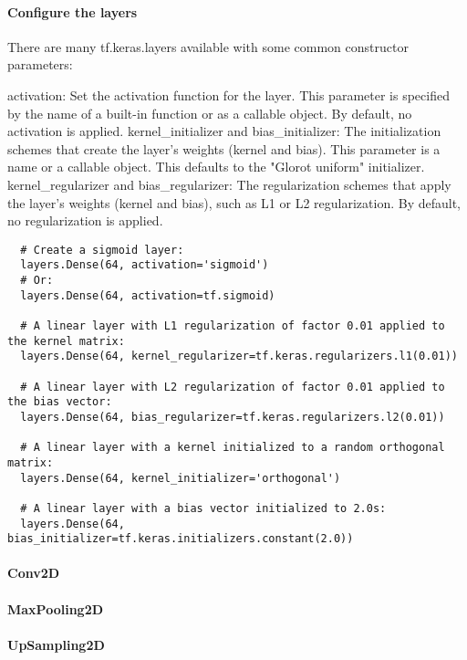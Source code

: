 \paragraph{Configure the layers}

There are many tf.keras.layers available with some common constructor parameters:

activation: Set the activation function for the layer. This parameter is specified by the name of a built-in function or as a callable object. By default, no activation is applied.
kernel_initializer and bias_initializer: The initialization schemes that create the layer's weights (kernel and bias). This parameter is a name or a callable object. This defaults to the "Glorot uniform" initializer.
kernel_regularizer and bias_regularizer: The regularization schemes that apply the layer's weights (kernel and bias), such as L1 or L2 regularization. By default, no regularization is applied.


\begin{verbatim}
  # Create a sigmoid layer:
  layers.Dense(64, activation='sigmoid')
  # Or:
  layers.Dense(64, activation=tf.sigmoid)

  # A linear layer with L1 regularization of factor 0.01 applied to the kernel matrix:
  layers.Dense(64, kernel_regularizer=tf.keras.regularizers.l1(0.01))

  # A linear layer with L2 regularization of factor 0.01 applied to the bias vector:
  layers.Dense(64, bias_regularizer=tf.keras.regularizers.l2(0.01))

  # A linear layer with a kernel initialized to a random orthogonal matrix:
  layers.Dense(64, kernel_initializer='orthogonal')

  # A linear layer with a bias vector initialized to 2.0s:
  layers.Dense(64, bias_initializer=tf.keras.initializers.constant(2.0))

\end{verbatim}


\paragraph{Conv2D}

\paragraph{MaxPooling2D}
\paragraph{UpSampling2D}

